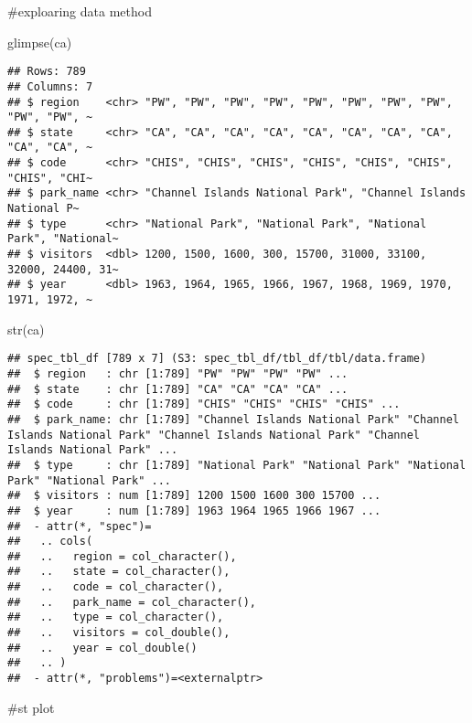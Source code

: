 \documentclass[
]{article}
\newenvironment{Shaded}{\begin{snugshade}}{\end{snugshade}}
\newcommand{\FunctionTok}[1]{\textcolor[rgb]{0.00,0.00,0.00}{#1}}
\newcommand{\NormalTok}[1]{#1}
\begin{document}
\#exploaring data method

\begin{Shaded}
\begin{Highlighting}[]
\FunctionTok{glimpse}\NormalTok{(ca)}
\end{Highlighting}
\end{Shaded}

\begin{verbatim}
## Rows: 789
## Columns: 7
## $ region    <chr> "PW", "PW", "PW", "PW", "PW", "PW", "PW", "PW", "PW", "PW", ~
## $ state     <chr> "CA", "CA", "CA", "CA", "CA", "CA", "CA", "CA", "CA", "CA", ~
## $ code      <chr> "CHIS", "CHIS", "CHIS", "CHIS", "CHIS", "CHIS", "CHIS", "CHI~
## $ park_name <chr> "Channel Islands National Park", "Channel Islands National P~
## $ type      <chr> "National Park", "National Park", "National Park", "National~
## $ visitors  <dbl> 1200, 1500, 1600, 300, 15700, 31000, 33100, 32000, 24400, 31~
## $ year      <dbl> 1963, 1964, 1965, 1966, 1967, 1968, 1969, 1970, 1971, 1972, ~
\end{verbatim}

\begin{Shaded}
\begin{Highlighting}[]
\FunctionTok{str}\NormalTok{(ca)}
\end{Highlighting}
\end{Shaded}

\begin{verbatim}
## spec_tbl_df [789 x 7] (S3: spec_tbl_df/tbl_df/tbl/data.frame)
##  $ region   : chr [1:789] "PW" "PW" "PW" "PW" ...
##  $ state    : chr [1:789] "CA" "CA" "CA" "CA" ...
##  $ code     : chr [1:789] "CHIS" "CHIS" "CHIS" "CHIS" ...
##  $ park_name: chr [1:789] "Channel Islands National Park" "Channel Islands National Park" "Channel Islands National Park" "Channel Islands National Park" ...
##  $ type     : chr [1:789] "National Park" "National Park" "National Park" "National Park" ...
##  $ visitors : num [1:789] 1200 1500 1600 300 15700 ...
##  $ year     : num [1:789] 1963 1964 1965 1966 1967 ...
##  - attr(*, "spec")=
##   .. cols(
##   ..   region = col_character(),
##   ..   state = col_character(),
##   ..   code = col_character(),
##   ..   park_name = col_character(),
##   ..   type = col_character(),
##   ..   visitors = col_double(),
##   ..   year = col_double()
##   .. )
##  - attr(*, "problems")=<externalptr>
\end{verbatim}

\#st plot
\end{document}
